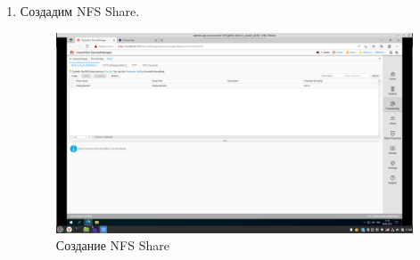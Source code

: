 \documentclass[a4paper,14pt]{extarticle}
\begin{document}
\begin{enumerate}
\item Создадим NFS Share. 

\begin{figure}[h!]
	\centering
	\includegraphics[width=0.7\linewidth]{"images/7/Снимок экрана от 2022-04-06 17-20-02"}
	\caption{Создание NFS Share}
	\label{fig:---2022-04-06-17-20-02}
\end{figure}



\end{enumerate}
\end{document}
